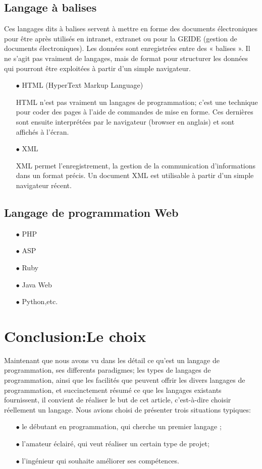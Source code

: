\documentclass[a4paper,12pt]{article} %
\begin{document}
\subsection{Langage à balises}
Ces langages dits à balises servent à mettre en forme des documents électroniques pour être après utilisés en intranet, extranet ou pour la GEIDE (gestion de documents électroniques). Les données sont enregistrées entre des
« balises ». Il ne s'agit pas vraiment de langages, mais de format pour structurer les données qui pourront être exploitées à partir d'un simple navigateur.
\begin{itemize}
\item[$\bullet$]HTML (HyperText Markup Language)

HTML n'est pas vraiment un langages de programmation; c'est une technique pour coder des pages à l'aide de commandes de mise en forme. Ces dernières sont ensuite interprétées par le navigateur (browser en anglais) et sont affichés à l'écran.

\item[$\bullet$]XML

XML permet l'enregistrement, la gestion de la communication d'informations dans un format précis. Un document XML est utilisable à partir d'un simple navigateur récent.

\end{itemize}
\subsection{Langage de programmation Web}
\begin{itemize}
    \item[$\bullet$]PHP
    \item[$\bullet$]ASP
    \item[$\bullet$]Ruby
    \item[$\bullet$]Java Web
    \item[$\bullet$]Python,etc.
\end{itemize}

\section{Conclusion:Le choix}
Maintenant que nous avons vu dans les détail ce qu'est un langage de programmation, ses differents paradigmes; les types de langages de programmation, ainsi que les facilités que peuvent offrir les divers langages de programmation, et succinctement résumé ce que les langages existants fournissent, il convient de réaliser le but de cet article, c’est-à-dire choisir réellement un langage. 
Nous avions choisi de présenter trois situations typiques:
\begin{itemize}
    \item[$\bullet$]le débutant en programmation, qui cherche un premier langage ;
    \item[$\bullet$]l’amateur éclairé, qui veut réaliser un certain type de projet;
    \item[$\bullet$]l’ingénieur qui souhaite améliorer ses compétences. 
\end{itemize}
\end{document}

